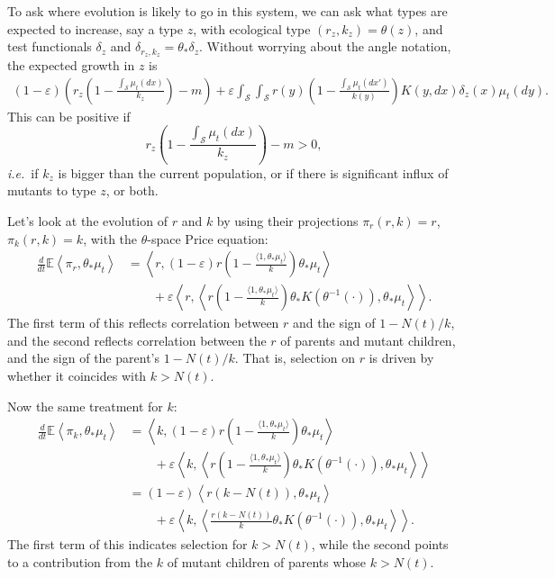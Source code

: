 \documentclass[11pt]{amsart}
\theoremstyle{remark}
\theoremstyle{definition}
\begin{document}
To ask where evolution is likely to go in this system, we can ask what types
are expected to increase, say a type $z$,
with ecological type $(r_z,k_z)=\theta(z)$, and test functionals
$\delta_z$ and $\delta_{r_z,k_z}=\theta_*\delta_z$.
Without worrying about the angle notation, the expected growth in $z$ is
\begin{align*}
	(1-\varepsilon) \left( r_z \left( 1 - \frac{\int_{\mathcal{S}} \mu_t(dx)}{k_z} \right) - m \right) + \varepsilon \int_{\mathcal{S}}\int_{\mathcal{S}}  r(y) \left( 1 - \frac{\int_{\mathcal{S}} \mu_t(dx')}{k(y)} \right) K(y,dx) \delta_z(x) \mu_t(dy).
\end{align*}
This can be positive if 
\[ r_z \left( 1 - \frac{\int_{\mathcal{S}} \mu_t(dx)}{k_z} \right) - m > 0, \]
\emph{i.e.}\ if $k_z$ is bigger than the current population,
or if there is significant influx of mutants to type $z$, or both.

Let's look at the evolution of $r$ and $k$ by using their projections
$\pi_r(r,k)=r$, $\pi_k(r,k)=k$, with the $\theta$-space Price equation:
\begin{align*}
	\frac{d}{dt}\mathbb{E}\left\langle \pi_r, \theta_{*}\mu_t \right\rangle
	&= \left\langle r, (1-\varepsilon) r \left( 1 - \frac{\langle 1, \theta_*{\mu_t}\rangle}{k} \right) \theta_*\mu_t \right\rangle \\
	& \qquad\mbox{} + \varepsilon \left\langle r, \left\langle r \left( 1 - \frac{\langle 1, \theta_*{\mu_t}\rangle}{k} \right) \theta_*K(\theta^{-1}(\cdot)), \theta_{*}\mu_t \right\rangle \right\rangle.
\end{align*}
The first term of this reflects correlation between $r$ and the sign of
$1-N(t)/k$,
and the second reflects correlation between the $r$ of parents and 
mutant children, and the sign of the parent's $1-N(t)/k$.
That is, selection on $r$ is driven by whether it coincides with
$k>N(t)$.

Now the same treatment for $k$:
\begin{align*}
	\frac{d}{dt}\mathbb{E}\left\langle \pi_k, \theta_{*}\mu_t \right\rangle
	&= \left\langle k, (1-\varepsilon) r \left( 1 - \frac{\langle 1, \theta_*{\mu_t}\rangle}{k} \right) \theta_*\mu_t \right\rangle \\
	& \qquad\mbox{} + \varepsilon \left\langle k, \left\langle r \left( 1 - \frac{\langle 1, \theta_*{\mu_t}\rangle}{k} \right) \theta_*K(\theta^{-1}(\cdot)), \theta_{*}\mu_t \right\rangle \right\rangle \\
	&= (1-\varepsilon) \left\langle r (k - N(t)), \theta_*\mu_t \right\rangle \\
	& \qquad\mbox{} + \varepsilon \left\langle k, \left\langle \frac{r \left( k - N(t) \right)}{k} \theta_*K(\theta^{-1}(\cdot)), \theta_{*}\mu_t \right\rangle \right\rangle .
\end{align*}
The first term of this indicates selection for $k>N(t)$,
while the second points to a contribution from the $k$ of mutant children
of parents whose $k>N(t)$.
\end{document}
